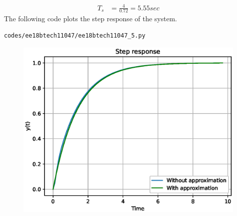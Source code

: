 \begin{enumerate}[label=\thesubsection.\arabic*.,ref=\thesubsection.\theenumi]
\begin{align}
T_{s} &= \frac{4}{0.72}=5.55 sec
\end{align}
The following code plots the step response of the system.
\begin{lstlisting}
codes/ee18btech11047/ee18btech11047_5.py
\end{lstlisting}
\begin{figure}[!ht]
\centering
\includegraphics[width=\columnwidth]{./figs/ee18btech11047/ee18btech11047_4.eps}
\caption{}
\label{fig:ee18btech11047_4}
\end{figure}
\end{enumerate}
